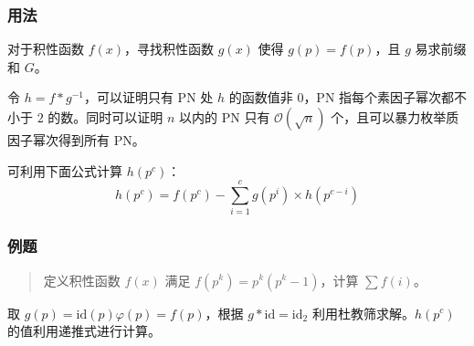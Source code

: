 \documentclass[10pt]{ctexart}
\begin{document}
\begin{multicols}{3}
    \subsubsection{用法}\label{ux7528ux6cd5-15}

    对于积性函数 \(f(x)\)，寻找积性函数 \(g(x)\) 使得
    \(g(p) = f(p)\)，且 \(g\) 易求前缀和 \(G\)。

    令 \(h = f * g^{-1}\)，可以证明只有 PN 处 \(h\) 的函数值非 \(0\)，PN
    指每个素因子幂次都不小于 \(2\) 的数。同时可以证明 \(n\) 以内的 PN
    只有 \(\mathcal O(\sqrt n)\) 个，且可以暴力枚举质因子幂次得到所有
    PN。

    可利用下面公式计算 \(h(p^c)\)：\[
    h(p^c) = f(p^c) - \sum_{i = 1}^c g(p^i) \times h(p^{c - i})
    \]

    \subsubsection{例题}\label{ux4f8bux9898-7}

    \begin{quote}
    定义积性函数 \(f(x)\) 满足 \(f(p^k) = p^k(p^k - 1)\)，计算
    \(\sum f(i)\)。
    \end{quote}

    取 \(g(p) = \mathrm{id}(p)\varphi(p) = f(p)\)，根据
    \(g * \mathrm{id} = \mathrm{id}_2\) 利用杜教筛求解。\(h(p^c)\)
    的值利用递推式进行计算。


\end{multicols}
\end{document}
